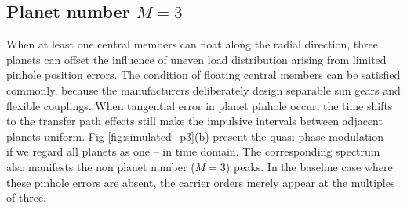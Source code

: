 \documentclass[a4paper,fleqn]{cas-sc}%
\begin{document}
\subsection{Planet number $M=3$}
\par When at least one central members can float along the radial direction, three planets can offset the influence of uneven load distribution arising from limited pinhole position errors. The condition of floating central members can be satisfied commonly, because the manufacturers deliberately design separable sun gears  and flexible couplings.  When tangential error in planet pinhole occur, the time shifts to the transfer path effects still make the impulsive intervals between adjacent planets uniform. Fig \ref{fig:simulated_p3}(b) present the quasi phase modulation -- if we regard all planets as one -- in time domain.  The corresponding spectrum also manifests the non planet number ($M=3$) peaks. In the baseline case where these pinhole errors are absent, the carrier orders merely appear at the multiples of three.
\end{document}
